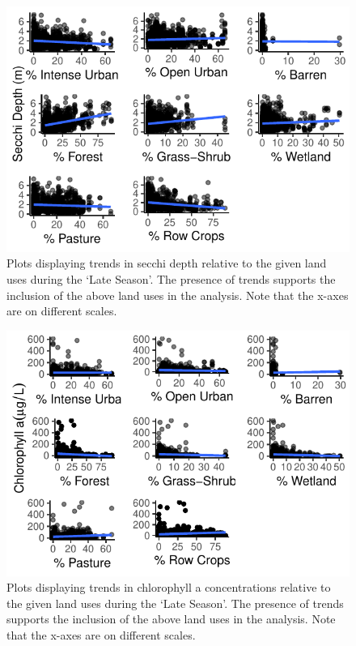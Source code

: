 \documentclass[12pt,]{article}
\begin{document}
\begin{figure}
\centering
\includegraphics{Bollt_Greif_Raby_Roth_Project_Final_files/figure-latex/unnamed-chunk-6-1.pdf}
\caption{Plots displaying trends in secchi depth relative to the given
land uses during the `Late Season'. The presence of trends supports the
inclusion of the above land uses in the analysis. Note that the x-axes
are on different scales.}
\end{figure}

\begin{figure}
\centering
\includegraphics{Bollt_Greif_Raby_Roth_Project_Final_files/figure-latex/unnamed-chunk-8-1.pdf}
\caption{Plots displaying trends in chlorophyll a concentrations
relative to the given land uses during the `Late Season'. The presence
of trends supports the inclusion of the above land uses in the analysis.
Note that the x-axes are on different scales.}
\end{figure}
\end{document}

